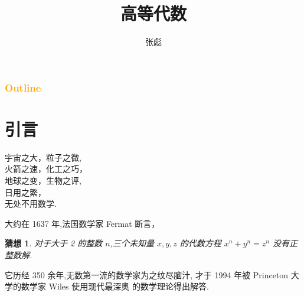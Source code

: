 \documentclass[13pt]{beamer}
\newtheorem*{conj}{猜想}
\begin{document}
\title[]{高等代数}
\author[]{{\large 张彪}\\  }

\date{}






\begin{frame}
\maketitle
\end{frame}

\begin{frame}
\frametitle{\textcolor{orange}{Outline}}
\tableofcontents
\end{frame}





\section{引言}

\begin{frame}

\begin{center}
{ \Large 宇宙之大，粒子之微,} \\[8pt]

{ \Large 火箭之速，化工之巧，}\\[8pt]

{ \Large 地球之变，生物之评,}\\[8pt]

{ \Large 日用之繁，}\qquad \qquad \qquad \qquad \quad \\[8pt]

{ \Large \qquad \qquad 无处不用数学.}
\end{center}



\end{frame}

\begin{frame}
大约在 1637 年,法国数学家 Fermat 断言，
\begin{conj}
	对于大于 2 的整数 $n$,三个未知量 $x, y, z$ 的代数方程 $x^{n}+y^{n}=z^{n}$ 没有正整数解. 
\end{conj}
\pause


它历经 350 余年,无数第一流的数学家为之纹尽脑汁, 才于 1994 年被 Princeton 大学的数学家 Wiles 使用现代最深奥 的数学理论得出解答. 

\end{frame}
\end{document}
